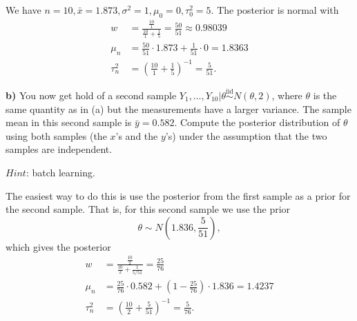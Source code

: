 \documentclass[
  letterpaper,
  DIV=11,
  numbers=noendperiod]{scrartcl}
\begin{document}
\begin{tcolorbox}[enhanced jigsaw, coltitle=black, breakable, colbacktitle=quarto-callout-note-color!10!white, colframe=quarto-callout-note-color-frame, bottomrule=.15mm, toprule=.15mm, rightrule=.15mm, arc=.35mm, colback=white, opacityback=0, bottomtitle=1mm, leftrule=.75mm, title={Solution}, titlerule=0mm, toptitle=1mm, left=2mm, opacitybacktitle=0.6]

We have \(n=10,\bar{x}=1.873,\sigma^{2}=1,\mu_{0}=0,\tau_{0}^{2}=5\).
The posterior is normal with \begin{align*}
      w &= \frac{\frac{10}{1}}{\frac{10}{1}+\frac{1}{5}}=\frac{50}{51}\approx0.98039 \\
      \mu_{n}   &= \frac{50}{51}\cdot1.873+\frac{1}{51}\cdot0=1.8363 \\
      \tau_{n}^{2}  &= \left(\frac{10}{1}+\frac{1}{5}\right)^{-1}=\frac{5}{51}.
    \end{align*}

\end{tcolorbox}

\textbf{b)} You now get hold of a second sample
\(Y_1,\ldots,Y_{10} | \theta \overset{\mathrm{iid}}{\sim} N(\theta ,2)\),
where \(\theta\) is the same quantity as in (a) but the measurements
have a larger variance. The sample mean in this second sample is
\(\bar{y}=0.582\). Compute the posterior distribution of \(\theta\)
using both samples (the \(x\)'s and the \(y\)'s) under the assumption
that the two samples are independent.

\(\textit{Hint}\): batch learning.

\begin{tcolorbox}[enhanced jigsaw, coltitle=black, breakable, colbacktitle=quarto-callout-note-color!10!white, colframe=quarto-callout-note-color-frame, bottomrule=.15mm, toprule=.15mm, rightrule=.15mm, arc=.35mm, colback=white, opacityback=0, bottomtitle=1mm, leftrule=.75mm, title={Solution}, titlerule=0mm, toptitle=1mm, left=2mm, opacitybacktitle=0.6]

The easiest way to do this is use the posterior from the first sample as
a prior for the second sample. That is, for this second sample we use
the prior \begin{equation*}
      \theta\sim N\left(1.836,\frac{5}{51}\right),
    \end{equation*} which gives the posterior \begin{align*}
      w &= \frac{\frac{10}{2}}{\frac{10}{2}+\frac{1}{5/51}}=\frac{25}{76} \\
\mu_{n} &= \frac{25}{76}\cdot0.582+\left(1-\frac{25}{76}\right)\cdot1.836=1.4237\\ 
\tau_{n}^{2}    &= \left(\frac{10}{2}+\frac{5}{51}\right)^{-1}=\frac{5}{76}.
    \end{align*}

\end{tcolorbox}
\end{document}
